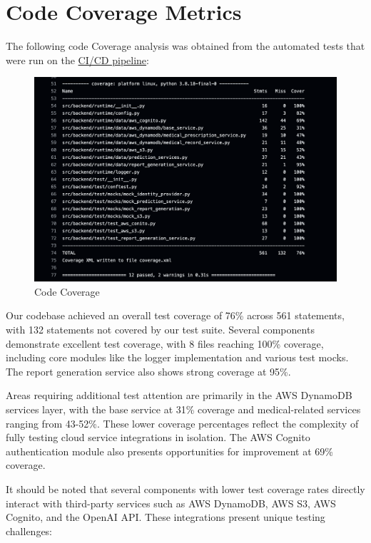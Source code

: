 \documentclass[12pt, titlepage]{article}
\begin{document}
  \clearpage
  \newpage
\section{Code Coverage Metrics}
The following code Coverage analysis was obtained from the automated tests that were run on the \href{https://github.com/RezaJodeiri/CXR-Capstone/actions/runs/13778734218}{CI/CD pipeline}:
\begin{figure}[ht!]
  \centering
  \includegraphics[scale=0.6]{../assets/cov.png}
  \caption{Code Coverage}
  \label{fig:Coverage}
\end{figure}

\vspace{10pt}
\noindent Our codebase achieved an overall test coverage of 76\% across 561 statements, with 132 statements not covered by our test suite. Several components demonstrate excellent test coverage, with 8 files reaching 100\% coverage, including core modules like the logger implementation and various test mocks. The report generation service also shows strong coverage at 95\%.

\vspace{10pt}
\noindent Areas requiring additional test attention are primarily in the AWS DynamoDB services layer, with the base service at 31\% coverage and medical-related services ranging from 43-52\%. These lower coverage percentages reflect the complexity of fully testing cloud service integrations in isolation. The AWS Cognito authentication module also presents opportunities for improvement at 69\% coverage.

\vspace{10pt}
\noindent It should be noted that several components with lower test coverage rates directly interact with third-party services such as AWS DynamoDB, AWS S3, AWS Cognito, and the OpenAI API. These integrations present unique testing challenges:
\end{document}
